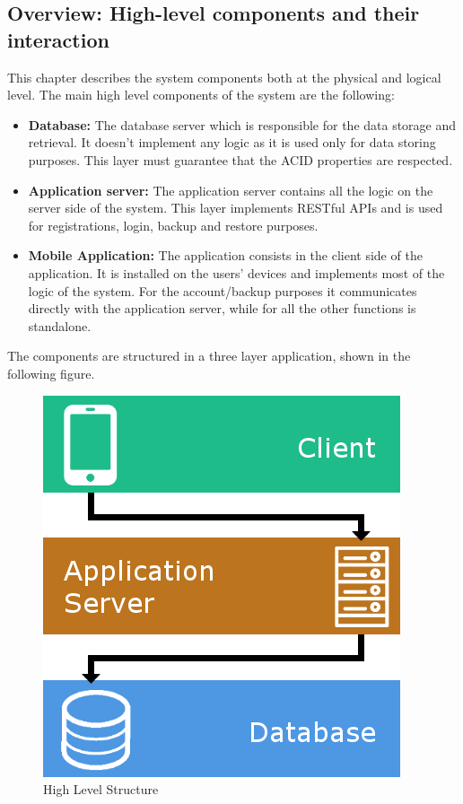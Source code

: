 \subsection{Overview: High-level components and their interaction}
This chapter describes the system components both at the physical and logical level.
The main high level components of the system are the following:
\begin{itemize}
\item
\textbf{Database:} The database server which is responsible for the data storage and retrieval. It doesn’t implement any logic as it is used only for data storing purposes. This layer must guarantee that the ACID properties are respected.
\item
\textbf{Application server:}  The application server contains all the logic on the server side of the system. This layer implements RESTful APIs and is used for registrations, login, backup and restore purposes.
\item
\textbf{Mobile Application:} The application consists in the client side of the application. It is installed on the users’ devices and implements most of the logic of the system. 
For the account/backup purposes it communicates directly with the application server, while for all the other functions is standalone.
\end{itemize}
The components are structured in a three layer application, shown in the following figure.
\begin{figure}[!h]
\centering
\includegraphics[scale=0.8]{images/highlevelstructure}
\caption{High Level Structure}
\label{ref:highlevelstructure}
\end{figure}

